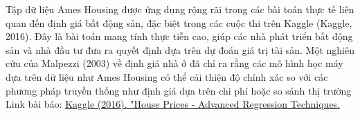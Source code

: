 Tập dữ liệu Ames Housing được ứng dụng rộng rãi trong các bài toán thực tế liên quan đến định giá bất động sản, đặc biệt trong các cuộc thi trên Kaggle (Kaggle, 2016). Đây là bài toán mang tính thực tiễn cao, giúp các nhà phát triển bất động sản và nhà đầu tư đưa ra quyết định dựa trên dự đoán giá trị tài sản. Một nghiên cứu của Malpezzi (2003) về định giá nhà ở đã chỉ ra rằng các mô hình học máy dựa trên dữ liệu như Ames Housing có thể cải thiện độ chính xác so với các phương pháp truyền thống như định giá dựa trên chi phí hoặc so sánh thị trường\\
Link bài báo: \href{https://www.kaggle.com/competitions/house-prices-advanced-regression-techniques}{Kaggle (2016). "House Prices - Advanced Regression Techniques.}